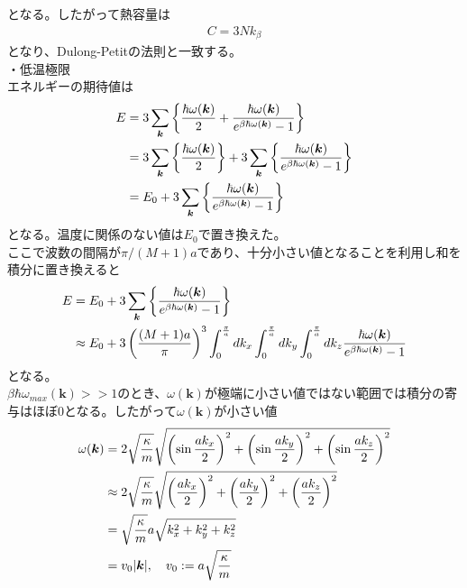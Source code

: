 \documentclass[dvipdfmx, 11pt, a4paper]{jsarticle}
\theoremstyle{definition}
\begin{document}
    となる。したがって熱容量は
    \begin{align}
        C = 3Nk_\beta 
    \end{align}
    となり、Dulong-Petitの法則と一致する。\\
    ・低温極限\\
    エネルギーの期待値は
    \begin{align}
        E &= 3 \sum_{\bm{k}} \left\{ \frac{\hbar \omega (\bm{k})}{2}  +\frac{\hbar \omega (\bm{k})}{ e^{\beta \hbar \omega (\bm{k})} - 1} \right\} \notag \\ 
        &= 3 \sum_{\bm{k}} \left\{ \frac{\hbar \omega (\bm{k})}{2}  \right\} + 3 \sum_{\bm{k}} \left\{ \frac{\hbar \omega (\bm{k})}{ e^{\beta \hbar \omega (\bm{k})} - 1} \right\} \notag \\ 
        &= E_0 + 3 \sum_{\bm{k}} \left\{ \frac{\hbar \omega (\bm{k})}{ e^{\beta \hbar \omega (\bm{k})} - 1} \right\} \notag 
    \end{align}
    となる。温度に関係のない値は$E_0$で置き換えた。\\
    ここで波数の間隔が$\pi / (M+1)a$であり、十分小さい値となることを利用し和を積分に置き換えると
    \begin{align}
        E &= E_0 + 3 \sum_{\bm{k}} \left\{ \frac{\hbar \omega (\bm{k})}{ e^{\beta \hbar \omega (\bm{k})} - 1} \right\} \notag  \notag \\
        &\approx E_0 + 3\left( \frac{(M+1)a}{\pi} \right)^3 \int_0^{\frac{\pi}{a}} dk_x \int_0^{\frac{\pi}{a}} dk_y \int_0^{\frac{\pi}{a}} dk_z \frac{\hbar \omega (\bm{k})}{ e^{\beta \hbar \omega (\bm{k})} - 1}  
    \end{align}
    となる。\\
    $\beta \hbar \omega_{max}(\bm{k}) >> 1$のとき、$\omega (\bm{k})$が極端に小さい値ではない範囲では積分の寄与はほぼ0となる。したがって$\omega (\bm{k})$が小さい値
    \begin{align}
        \omega (\bm{k}) &= 2 \sqrt{\frac{\kappa}{m}} \sqrt{\left( \sin \frac{ak_x}{2} \right)^2 + \left( \sin \frac{ak_y}{2} \right)^2 + \left( \sin \frac{ak_z}{2} \right)^2} \notag \\
        &\approx 2 \sqrt{\frac{\kappa}{m}} \sqrt{\left( \frac{ak_x}{2} \right)^2 + \left( \frac{ak_y}{2} \right)^2 + \left( \frac{ak_z}{2} \right)^2} \notag \\
        &= \sqrt{\frac{\kappa}{m}} a \sqrt{ k_x^2 + k_y^2 + k_z^2} \notag \\
        &= v_0 |\bm{k}| , \quad v_0 := a\sqrt{\frac{\kappa}{m}} 
    \end{align}
\end{document}
